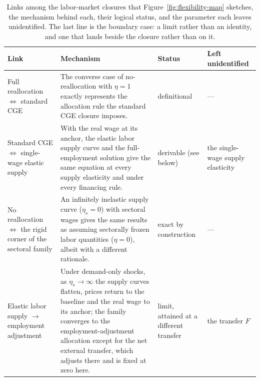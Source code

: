 \begin{table}[htbp]
\centering
\footnotesize
\setlength{\tabcolsep}{5pt}
\renewcommand{\arraystretch}{1.25}
\begin{tabular}{@{}>{\raggedright\arraybackslash}p{3.3cm}
                  >{\raggedright\arraybackslash}p{5.5cm}
                  >{\raggedright\arraybackslash}p{2.1cm}
                  >{\raggedright\arraybackslash}p{2.8cm}@{}}
\toprule
Link & Mechanism & Status & Left unidentified \\
\midrule
Full reallocation $\Leftrightarrow$ standard CGE
& The converse case of no-reallocation with $\eta = 1$ exactly represents the allocation rule the standard CGE closure imposes.
& definitional
& ---  \\[3pt]
Standard CGE $\Leftrightarrow$ single-wage elastic supply
& With the real wage at its anchor, the elastic labor supply curve and the full-employment solution give the same equation at every supply elasticity and under every financing rule.
& derivable (see below)
& the single-wage supply elasticity \\[3pt]
No reallocation $\Leftrightarrow$ the rigid corner of the sectoral family
& An infinitely inelastic supply curve ($\eta_s=0$) with sectoral wages gives the same results as assuming sectorally frozen labor quantities ($\eta=0$), albeit with a different rationale.
& exact by construction
& ---  \\[3pt]
Elastic labor supply $\rightarrow$ employment adjustment
& Under demand-only shocks, as $\eta_s\to\infty$ the supply curves flatten, prices return to the baseline and the real wage to its anchor; the family converges to the employment-adjustment allocation except for the net external transfer, which adjusts there and is fixed at zero here.
& limit, attained at a different transfer
& the transfer $F$ \\
\bottomrule
\end{tabular}
\caption{Links among the labor-market closures that
Figure~\ref{fig:flexibility-map} sketches, the mechanism behind each, their
logical status, and the parameter each leaves unidentified. The last line is
the boundary case: a limit rather than an identity, and one that lands beside
the closure rather than on it.}
\label{tab:equiv-links}
\end{table}
